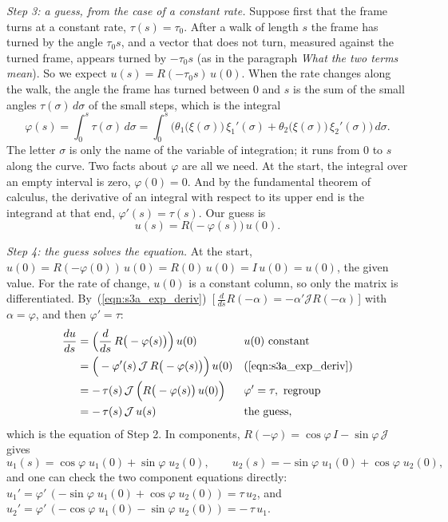 \emph{Step 3: a guess, from the case of a constant rate.} Suppose first that the frame turns at a constant rate, $\tau(s) = \tau_0$. After a walk of length $s$ the frame has turned by the angle $\tau_0 s$, and a vector that does not turn, measured against the turned frame, appears turned by $-\tau_0 s$ (as in the paragraph \emph{What the two terms mean}). So we expect $u(s) = R(-\tau_0 s)\,u(0)$. When the rate changes along the walk, the angle the frame has turned between $0$ and $s$ is the sum of the small angles $\tau(\sigma)\,d\sigma$ of the small steps, which is the integral
\begin{equation}
\label{eqn:r3_turn_angle}
\varphi(s) = \int_0^s \tau(\sigma)\,d\sigma = \int_0^s \Big(\theta_1\big(\xi(\sigma)\big)\,\xi_1'(\sigma) + \theta_2\big(\xi(\sigma)\big)\,\xi_2'(\sigma)\Big)\, d\sigma .
\end{equation}
The letter $\sigma$ is only the name of the variable of integration; it runs from $0$ to $s$ along the curve. Two facts about $\varphi$ are all we need. At the start, the integral over an empty interval is zero, $\varphi(0) = 0$. And by the fundamental theorem of calculus, the derivative of an integral with respect to its upper end is the integrand at that end, $\varphi'(s) = \tau(s)$. Our guess is
\begin{equation*}
u(s) = R\big(-\varphi(s)\big)\, u(0) .
\end{equation*}

\emph{Step 4: the guess solves the equation.} At the start, $u(0) = R(-\varphi(0))\,u(0) = R(0)\,u(0) = I\,u(0) = u(0)$, the given value. For the rate of change, $u(0)$ is a constant column, so only the matrix is differentiated. By~(\ref{eqn:s3a_exp_deriv})~[\,$\frac{d}{ds}R(-\alpha) = -\alpha'\mathcal JR(-\alpha)$\,] with $\alpha = \varphi$, and then $\varphi' = \tau$:
\begin{align*}
\frac{du}{ds} &= \Big(\frac{d}{ds}\, R\big(-\varphi(s)\big)\Big)\, u(0) && u(0) \text{ constant} \\
&= \Big(-\varphi'(s)\,\mathcal J\, R\big(-\varphi(s)\big)\Big)\, u(0) && \text{(\ref{eqn:s3a_exp_deriv})} \\
&= -\,\tau(s)\,\mathcal J\,\Big(R\big(-\varphi(s)\big)\, u(0)\Big) && \varphi' = \tau,\ \text{regroup} \\
&= -\,\tau(s)\,\mathcal J\, u(s) && \text{the guess,}
\end{align*}
which is the equation of Step 2. In components, $R(-\varphi) = \cos\varphi\, I - \sin\varphi\,\mathcal J$ gives
\begin{equation*}
u_1(s) = \cos\varphi\; u_1(0) + \sin\varphi\; u_2(0), \qquad u_2(s) = -\sin\varphi\; u_1(0) + \cos\varphi\; u_2(0),
\end{equation*}
and one can check the two component equations directly: $u_1' = \varphi'\,(-\sin\varphi\; u_1(0) + \cos\varphi\; u_2(0)) = \tau\, u_2$, and $u_2' = \varphi'\,(-\cos\varphi\; u_1(0) - \sin\varphi\; u_2(0)) = -\,\tau\, u_1$.

